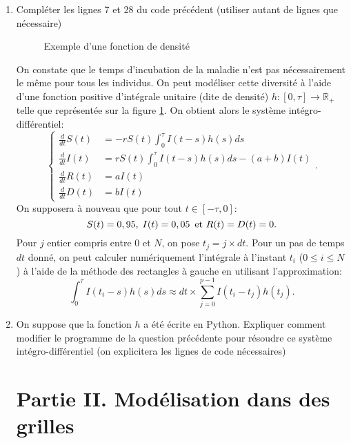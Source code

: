 \begin{enumerate}
\item Compl\'eter les lignes 7 et 28 du code pr\'ec\'edent (utiliser autant de lignes que n\'ecessaire)
\begin{figure}[!h]
\centering
{}
\caption{Exemple d'une fonction de densit\'e}
\label{densite}
\end{figure}
On constate que le temps d'incubation de la maladie n'est pas n\'ecessairement le m\^eme pour tous les individus. On peut mod\'eliser cette diversit\'e \`a l'aide d'une fonction positive d'int\'egrale unitaire (dite de densit\'e) $h: [0,\tau] \rightarrow \mathbb{R}_+$ telle que repr\'esent\'ee sur la figure \ref{densite}. On obtient alors le syst\`eme int\'egro-diff\'erentiel:
\[
\left\{ 
\begin{aligned}
\frac{d}{dt}S(t) & =  -rS(t)\int_0^\tau I(t-s)h(s)ds \\
\frac{d}{dt}I(t) & =  rS(t)\int_0^\tau I(t-s)h(s)ds-(a+b)I(t)\\
\frac{d}{dt}R(t) & =  a I(t) \\
\frac{d}{dt}D(t) & =  bI(t)
\end{aligned}
\right. .
\]
On supposera \`a nouveau que pour tout $t \in [-\tau,0]$:
\[
S(t)=0,95,\; I(t)=0,05\, \text{ et } R(t)=D(t)=0.\\  
\]
Pour $j$ entier compris entre 0 et $N$, on pose $t_j=j\times dt$. Pour un pas de temps $dt$ donn\'e, on peut calculer num\'eriquement l'int\'egrale \`a l'instant $t_i$ ($0\leq i \leq N$) \`a l'aide de la m\'ethode des rectangles \`a gauche en utilisant l'approximation:
$$
\int_0^\tau I(t_i-s)h(s)ds \approx dt \times \sum_{j=0}^{p-1}I(t_i-t_j)h(t_j).
$$
\item On suppose que la fonction $h$ a \'et\'e \'ecrite en Python. Expliquer comment modifier le programme de la question pr\'ec\'edente pour r\'esoudre ce syst\`eme int\'egro-diff\'erentiel (on explicitera les lignes de code n\'ecessaires)

\section*{Partie II. Mod\'elisation dans des grilles}


\end{enumerate}
